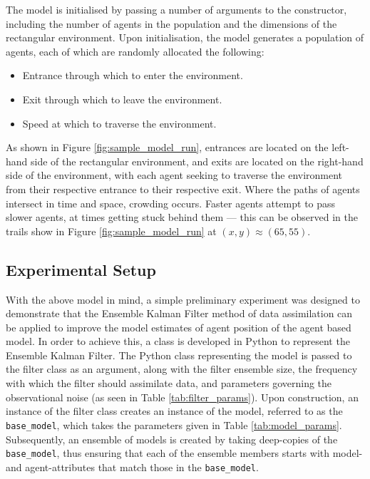 The model is initialised by passing a number of arguments to the constructor,
including the number of agents in the population and the dimensions of the
rectangular environment.
Upon initialisation, the model generates a population of agents, each of which
are randomly allocated the following:
\begin{itemize}
    \item Entrance through which to enter the environment.
    \item Exit through which to leave the environment.
    \item Speed at which to traverse the environment.
\end{itemize}
As shown in Figure \ref{fig:sample_model_run}, entrances are located on the
left-hand side of the rectangular environment, and exits are located on the
right-hand side of the environment, with each agent seeking to traverse the
environment from their respective entrance to their respective exit.
Where the paths of agents intersect in time and space, crowding occurs.
Faster agents attempt to pass slower agents, at times getting stuck behind them
--- this can be observed in the trails show in Figure \ref{fig:sample_model_run}
at $(x, y) \approx (65, 55)$.


\subsection{Experimental Setup}\label{sub:method:experiments}

With the above model in mind, a simple preliminary experiment was designed to
demonstrate that the Ensemble Kalman Filter method of data assimilation can be
applied to improve the model estimates of agent position of the agent based
model.
In order to achieve this, a class is developed in Python to represent the
Ensemble Kalman Filter.
The Python class representing the model is passed to the filter class as an
argument, along with the filter ensemble size, the frequency with which the
filter should assimilate data, and parameters governing the observational noise
(as seen in Table \ref{tab:filter_params}).
Upon construction, an instance of the filter class creates an instance of the
model, referred to as the \texttt{base\_model}, which takes the parameters given
in Table \ref{tab:model_params}.
Subsequently, an ensemble of models is created by taking deep-copies of the
\texttt{base\_model}, thus ensuring that each of the ensemble members starts
with model- and agent-attributes that match those in the \texttt{base\_model}.

